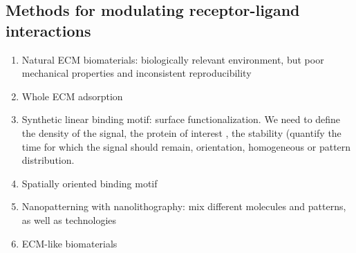 \subsection{Methods for modulating receptor-ligand interactions}
\begin{enumerate}
\item Natural ECM biomaterials: biologically relevant environment, but poor mechanical properties and inconsistent reproducibility
\item Whole ECM adsorption
\item Synthetic linear binding motif: surface functionalization. We need to define the density of the signal, the protein of interest , the stability (quantify the time for which the signal should remain, orientation, homogeneous or pattern distribution.
\item Spatially oriented binding motif
\item Nanopatterning with nanolithography: mix different molecules and patterns, as well as technologies
\item ECM-like biomaterials
\end{enumerate}




